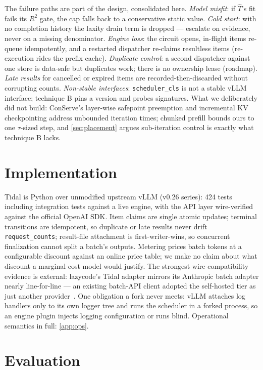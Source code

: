 \documentclass[conference]{IEEEtran}
\newcommand{\code}[1]{\texttt{#1}}
\begin{document}
The failure paths are part of the design, consolidated here. \emph{Model misfit}: if
$\hat{T}$'s fit fails its $R^2$ gate, the cap falls back to a conservative static value.
\emph{Cold start}: with no completion history the laxity drain term is dropped ---
escalate on evidence, never on a missing denominator. \emph{Engine loss}: the circuit
opens, in-flight items re-queue idempotently, and a restarted dispatcher re-claims
resultless items (re-execution rides the prefix cache). \emph{Duplicate control}: a
second dispatcher against one store is data-safe but duplicates work; there is no
ownership lease (roadmap). \emph{Late results} for cancelled or expired items are
recorded-then-discarded without corrupting counts. \emph{Non-stable interfaces}:
\code{scheduler\_cls} is not a stable vLLM interface; technique B pins a version and
probes signatures. What we deliberately did not build: ConServe's layer-wise safepoint
preemption and incremental KV checkpointing address unbounded iteration times; chunked
prefill bounds ours to one $\tau$-sized step, and \cref{sec:placement} argues
sub-iteration control is exactly what technique B lacks.

\section{Implementation}
\label{sec:impl}

Tidal is Python over unmodified upstream vLLM (v0.26 series): 424 tests including
integration tests against a live engine, with the API layer wire-verified against the
official OpenAI SDK. Item claims are single atomic updates; terminal transitions are
idempotent, so duplicate or late results never drift \code{request\_counts};
result-file attachment is first-writer-wins, so concurrent finalization cannot split a
batch's outputs. Metering prices batch tokens at a configurable discount against an
online price table; we make no claim about what discount a marginal-cost model would
justify. The strongest wire-compatibility evidence is external: lazycode's Tidal adapter
mirrors its Anthropic batch adapter nearly line-for-line --- an existing batch-API client
adopted the self-hosted tier as just another provider~\citep{lazycode-paper}. One
obligation a fork never meets: vLLM attaches log handlers only to its own logger tree and
runs the scheduler in a forked process, so an engine plugin injects logging configuration
or runs blind. Operational semantics in full: \cref{app:ops}.

\section{Evaluation}
\label{sec:eval}
\end{document}
